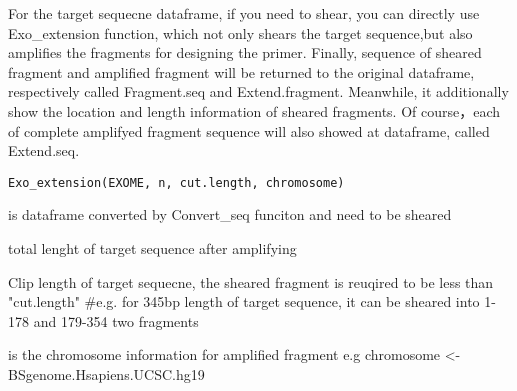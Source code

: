 \documentclass[a4paper]{book}
\begin{document}
%
\begin{Description}\relax
For the target sequecne dataframe, if you  need to shear, you can directly use Exo\_extension function,
which not only shears the target sequence,but also amplifies the fragments for designing the primer. Finally,
sequence of sheared fragment and amplified fragment will be returned to the original dataframe, respectively
called Fragment.seq and Extend.fragment. Meanwhile, it additionally show the location and length information of sheared
fragments. Of course，each of complete amplifyed fragment sequence will also showed at dataframe, called Extend.seq.
\end{Description}
%
\begin{Usage}
\begin{verbatim}
Exo_extension(EXOME, n, cut.length, chromosome)
\end{verbatim}
\end{Usage}
%
\begin{Arguments}
\begin{ldescription}
\item[\code{EXOME}] is dataframe converted by Convert\_seq funciton and need to be sheared

\item[\code{n}] total lenght of target sequence after amplifying

\item[\code{cut.length}] Clip length of target sequecne, the sheared fragment is reuqired to be less than "cut.length"
\#e.g. for 345bp length of target sequence, it can be sheared into 1-178 and 179-354 two fragments

\item[\code{chromosome}] is the chromosome information for amplified fragment
e.g chromosome <- BSgenome.Hsapiens.UCSC.hg19
\end{ldescription}
\end{Arguments}
%
\begin{Examples}
\end{Examples}
\end{document}
